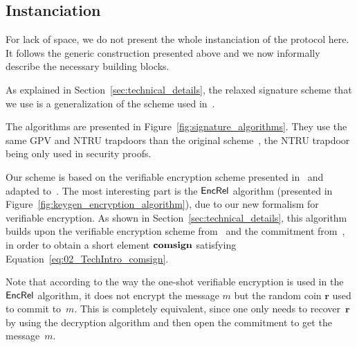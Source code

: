 \subsection{Instanciation}

For lack of space, we do not present the whole instanciation of the 
protocol here. It follows the generic construction presented 
above and we now informally describe the necessary building blocks.


\label{sec:instanciation_relaxed_signature_scheme} As explained in 
Section~\ref{sec:technical_details}, the relaxed signature scheme that 
we use is a generalization of the scheme used in~\cite{CCS:delLyuSei18}.

	The algorithms are presented in 
Figure~\ref{fig:signature_algorithms}. They use the same GPV and NTRU 
trapdoors than the original scheme~\cite{CCS:delLyuSei18}, the NTRU 
trapdoor being only used in security proofs.


\begin{figure*}[htp!]


\caption{\label{fig:signature_algorithms}Signature algorithms}
\end{figure*}


%
%

\label{sec:instanciation_relaxed_verifiable_encryption}
	Our scheme is based on the verifiable encryption scheme 
presented in~\cite{EC:LyuNev17} and adapted to~\cite{C:AttLyuSei20}. 
The most interesting part is the $\mathsf{EncRel}$ algorithm (presented in 
Figure~\ref{fig:keygen_encryption_algorithm}), due to our new formalism 
for verifiable encryption. As shown in 
Section~\ref{sec:technical_details}, this algorithm builds upon the 
verifiable encryption scheme from~\cite{EC:LyuNev17} and the commitment 
from~\cite{CCS:delLyuSei18}, in order to obtain a short element 
$\mathbf{comsign}$ satisfying Equation~\eqref{eq:02_TechIntro_comsign}.

Note that according to the way the one-shot verifiable encryption is 
used in the $\mathsf{EncRel}$ algorithm, it does not encrypt the message $m$ but 
the random coin $\textbf{r}$ used to commit 
to~$m$. This is completely equivalent, since one only needs to 
recover~$\textbf{r}$ by using the decryption algorithm and then open the
commitment to get the message~$m$.

